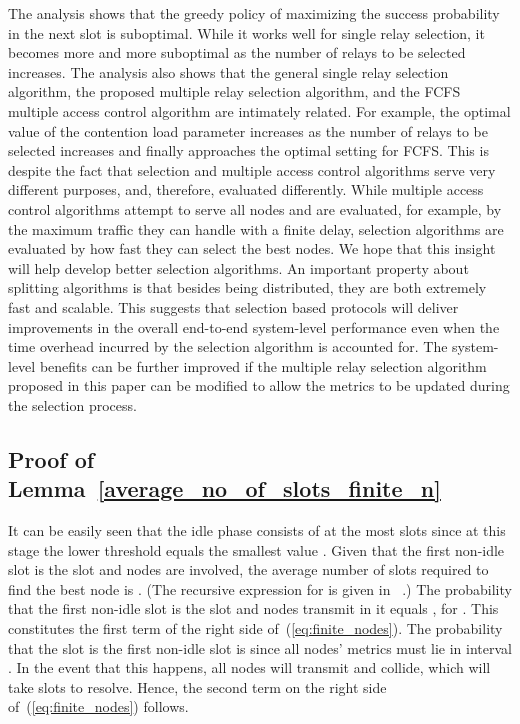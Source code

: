 \documentclass[12pt,draftcls,peerreview, onecolumn]{IEEEtran}
\newcommand{\eqn}[1]{(\ref{#1})}
\begin{document}
The analysis shows that the greedy policy of maximizing the success
probability in the next slot is suboptimal. While it works well for
single relay selection, it becomes more and more suboptimal as the
number of relays to be selected increases.  The analysis also shows
that the general single relay selection algorithm, the proposed
multiple relay selection algorithm, and the FCFS multiple access
control algorithm are intimately related. For example, the optimal
value of the contention load parameter increases as the number of
relays to be selected increases and finally approaches the optimal
setting for FCFS.  This is despite the fact that selection and
multiple access control algorithms serve very different purposes, and,
therefore, evaluated differently. While multiple access control
algorithms attempt to serve all nodes and are evaluated, for example,
by the maximum traffic they can handle with a finite delay, selection
algorithms are evaluated by how fast they can select the best nodes.
We hope that this insight will help develop better selection
algorithms.  An important property about splitting algorithms is that
besides being distributed, they are both extremely fast and scalable.
This suggests that selection based protocols will deliver improvements
in the overall end-to-end system-level performance even when the time
overhead incurred by the selection algorithm is accounted for. The
system-level benefits can be further improved if the multiple relay
selection algorithm proposed in this paper can be modified to allow
the metrics to be updated during the selection process.



\appendix

\subsection{Proof of Lemma~\ref{average_no_of_slots_finite_n}}
\label{proof of average_no_of_slots_finite_n}
It can be easily seen that the idle phase consists of at the most  slots since at this stage the lower threshold
equals the smallest value .  Given that the first non-idle slot is
the  slot and  nodes are involved, the average number of
slots required to find the best node is . (The recursive
expression for  is given in~ \cite[(6)]{qin_infocomm_2004}.)
The probability that the first non-idle slot is the  slot and
 nodes transmit in it equals , for . This constitutes
the first term of the right side of~\eqn{eq:finite_nodes}.  The
probability that the  slot is the first non-idle slot is
 since all nodes' metrics must lie in interval
. In the event that this happens, all  nodes will
transmit and collide, which will take  slots to resolve.
Hence, the second term on the right side of~\eqn{eq:finite_nodes}
follows.
\end{document}
